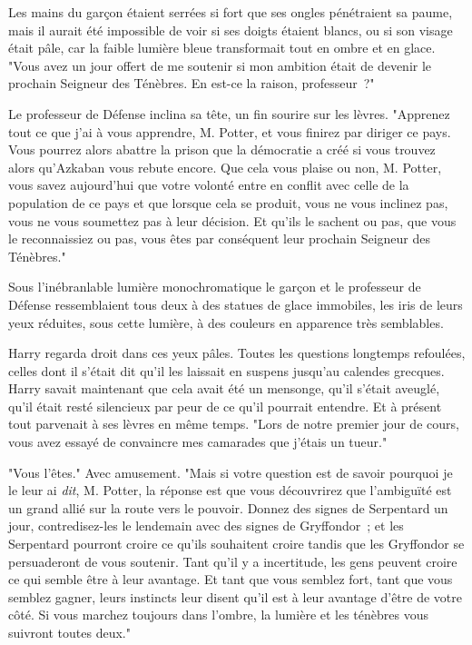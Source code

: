 Les mains du garçon étaient serrées si fort que ses ongles pénétraient sa paume, mais il aurait été impossible de voir si ses doigts étaient blancs, ou si son visage était pâle, car la faible lumière bleue transformait tout en ombre et en glace. "Vous avez un jour offert de me soutenir si mon ambition était de devenir le prochain Seigneur des Ténèbres. En est-ce la raison, professeur~?"

Le professeur de Défense inclina sa tête, un fin sourire sur les lèvres. "Apprenez tout ce que j'ai à vous apprendre, M. Potter, et vous finirez par diriger ce pays. Vous pourrez alors abattre la prison que la démocratie a créé si vous trouvez alors qu'Azkaban vous rebute encore. Que cela vous plaise ou non, M. Potter, vous savez aujourd'hui que votre volonté entre en conflit avec celle de la population de ce pays et que lorsque cela se produit, vous ne vous inclinez pas, vous ne vous soumettez pas à leur décision. Et qu'ils le sachent ou pas, que vous le reconnaissiez ou pas, vous êtes par conséquent leur prochain Seigneur des Ténèbres."

Sous l'inébranlable lumière monochromatique le garçon et le professeur de Défense ressemblaient tous deux à des statues de glace immobiles, les iris de leurs yeux réduites, sous cette lumière, à des couleurs en apparence très semblables.

Harry regarda droit dans ces yeux pâles. Toutes les questions longtemps refoulées, celles dont il s'était dit qu'il les laissait en suspens jusqu'au calendes grecques. Harry savait maintenant que cela avait été un mensonge, qu'il s'était aveuglé, qu'il était resté silencieux par peur de ce qu'il pourrait entendre. Et à présent tout parvenait à ses lèvres en même temps. "Lors de notre premier jour de cours, vous avez essayé de convaincre mes camarades que j'étais un tueur."

"Vous l'êtes." Avec amusement. "Mais si votre question est de savoir pourquoi je le leur ai \emph{dit}, M. Potter, la réponse est que vous découvrirez que l'ambiguïté est un grand allié sur la route vers le pouvoir. Donnez des signes de Serpentard un jour, contredisez-les le lendemain avec des signes de Gryffondor~; et les Serpentard pourront croire ce qu'ils souhaitent croire tandis que les Gryffondor se persuaderont de vous soutenir. Tant qu'il y a incertitude, les gens peuvent croire ce qui semble être à leur avantage. Et tant que vous semblez fort, tant que vous semblez gagner, leurs instincts leur disent qu'il est à leur avantage d'être de votre côté. Si vous marchez toujours dans l'ombre, la lumière et les ténèbres vous suivront toutes deux."

